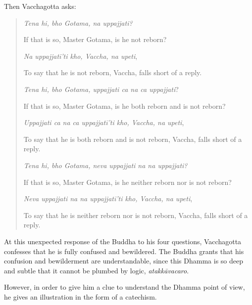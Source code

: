 Then Vacchagotta asks:

\begin{quote}
\emph{Tena hi, bho Gotama, na uppajjati?}

If that is so, Master Gotama, is he not reborn?

\emph{Na uppajjatī'ti kho, Vaccha, na upeti},

To say that he is not reborn, Vaccha, falls short of a reply.

\emph{Tena hi, bho Gotama, uppajjati ca na ca uppajjati}?

If that is so, Master Gotama, is he both reborn and is not reborn?

\emph{Uppajjati ca na ca uppajjatī'ti kho, Vaccha, na upeti},

To say that he is both reborn and is not reborn, Vaccha, falls short of a reply.

\emph{Tena hi, bho Gotama, neva uppajjati na na uppajjati?}

If that is so, Master Gotama, is he neither reborn nor is not reborn?

\emph{Neva uppajjati na na uppajjatī'ti kho, Vaccha, na upeti},

To say that he is neither reborn nor is not reborn, Vaccha, falls short of a reply.
\end{quote}

At this unexpected response of the Buddha to his four questions, Vacchagotta confesses that he is fully confused and bewildered. The Buddha grants that his confusion and bewilderment are understandable, since this Dhamma is so deep and subtle that it cannot be plumbed by logic, \emph{atakkāvacaro}.

However, in order to give him a clue to understand the Dhamma point of view, he gives an illustration in the form of a catechism.

